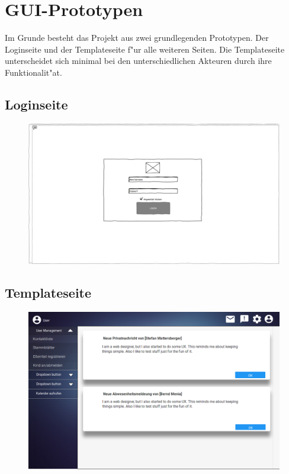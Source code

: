 \newpage
\section{GUI-Prototypen}
Im Grunde besteht das Projekt aus zwei grundlegenden Prototypen. Der Loginseite und der Templateseite f"ur alle weiteren Seiten. 
Die Templateseite unterscheidet sich minimal bei den unterschiedlichen Akteuren durch ihre Funktionalit"at.

\subsection{Loginseite}
 \begin{figure}[ht!]
  \includegraphics[width = 150mm]{pictures/Login.PNG}
 \end{figure}
 
 \newpage
 \subsection{Templateseite}
 \begin{figure}[ht!]
  \includegraphics[width = 150mm]{pictures/Template.png}
 \end{figure}
 
